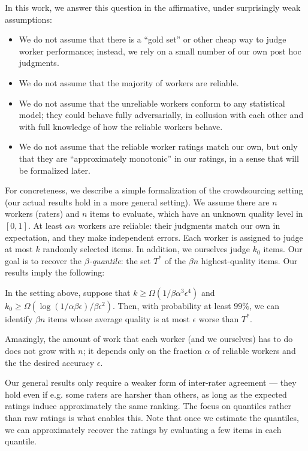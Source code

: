 In this work, we answer this question in the affirmative, under surprisingly 
weak assumptions:
\begin{itemize}
\item We do not assume that there is a ``gold set'' or other cheap way to judge 
      worker performance; instead, we rely on a small number of our own post hoc judgments.
\item We do not assume that the majority of workers are reliable.
\item We do not assume that the unreliable workers conform to any statistical 
      model; they could behave fully adversarially, in collusion with each other 
      and with full knowledge of how the reliable workers behave.
\item We do not assume that the reliable worker ratings match our own, but only that they are 
      ``approximately monotonic'' in our ratings, in a sense that will be 
      formalized later.
\end{itemize}
For concreteness, we describe a simple formalization of the crowdsourcing 
setting (our actual results hold in a more general setting). We assume 
there are $n$ workers (raters) and $n$ items to evaluate, which have an unknown 
quality level in $[0,1]$. At least $\alpha n$ workers are reliable:
their judgments match our own in expectation, and they make independent errors.
Each worker is assigned to judge at most $k$ randomly selected 
items. In addition, we ourselves judge $k_0$ items. Our goal is to 
recover the \emph{$\beta$-quantile}: the set $T^*$ of the $\beta n$ highest-quality items. 
Our results imply the following:



\begin{theorem}
\label{thm:intro}
In the setting above, suppose that
$k \geq \Omega(1/\beta\alpha^3\epsilon^4)$ and 
$k_0 \geq \Omega(\log(1/\alpha\beta\epsilon)/\beta\epsilon^2)$. Then, with probability 
at least $99\%$, we can identify $\beta n$ items whose average quality is at most 
$\epsilon$ worse than $T^*$.
\end{theorem}
Amazingly, the amount of work that each worker (and we ourselves) has 
to do does not grow with $n$; it depends only on the fraction $\alpha$ of 
reliable workers and the the desired accuracy $\epsilon$.

Our general results only require a weaker form of inter-rater agreement --- 
they hold even if e.g. some raters are harsher than others, as long as 
the expected ratings induce approximately the same ranking.
The focus on quantiles rather than raw ratings is what enables this. 
Note that once we estimate the quantiles, we can approximately recover the 
ratings by evaluating a few items in each quantile.

